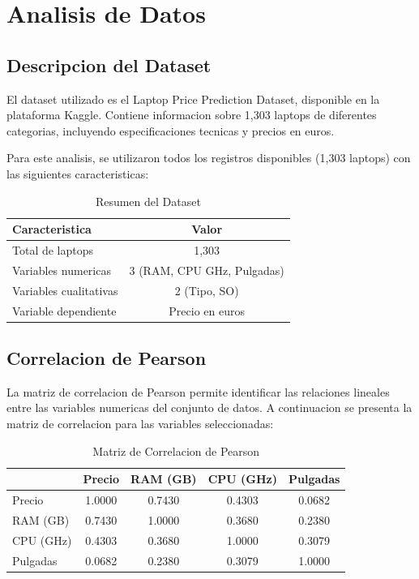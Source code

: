 \documentclass[12pt,a4paper]{article}
\begin{document}
\section{Analisis de Datos}

\subsection{Descripcion del Dataset}

El dataset utilizado es el Laptop Price Prediction Dataset, disponible en la plataforma Kaggle. Contiene informacion sobre 1,303 laptops de diferentes categorias, incluyendo especificaciones tecnicas y precios en euros.

Para este analisis, se utilizaron todos los registros disponibles (1,303 laptops) con las siguientes caracteristicas:

\begin{table}[H]
\centering
\caption{Resumen del Dataset}
\begin{tabular}{lc}
\toprule
\textbf{Caracteristica} & \textbf{Valor} \\
\midrule
Total de laptops & 1,303 \\
Variables numericas & 3 (RAM, CPU GHz, Pulgadas) \\
Variables cualitativas & 2 (Tipo, SO) \\
Variable dependiente & Precio en euros \\
\bottomrule
\end{tabular}
\end{table}

\subsection{Correlacion de Pearson}

La matriz de correlacion de Pearson permite identificar las relaciones lineales entre las variables numericas del conjunto de datos. A continuacion se presenta la matriz de correlacion para las variables seleccionadas:

\begin{table}[H]
\centering
\caption{Matriz de Correlacion de Pearson}
\begin{tabular}{lcccc}
\toprule
 & \textbf{Precio} & \textbf{RAM (GB)} & \textbf{CPU (GHz)} & \textbf{Pulgadas} \\
\midrule
Precio & 1.0000 & 0.7430 & 0.4303 & 0.0682 \\
RAM (GB) & 0.7430 & 1.0000 & 0.3680 & 0.2380 \\
CPU (GHz) & 0.4303 & 0.3680 & 1.0000 & 0.3079 \\
Pulgadas & 0.0682 & 0.2380 & 0.3079 & 1.0000 \\
\bottomrule
\end{tabular}
\end{table}
\end{document}
